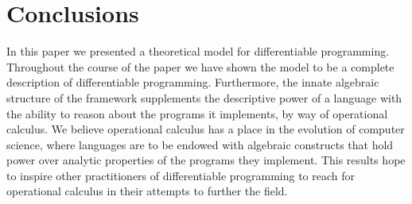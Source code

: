 \section{Conclusions}

In this paper we presented a theoretical model for differentiable programming.
Throughout the course of the paper we have shown the model to be a complete description of differentiable programming.
Furthermore, the innate algebraic structure of the framework supplements the descriptive power of a language with the ability to reason about the programs it implements, by way of operational calculus.
We believe operational calculus has a place in the evolution of computer science, where languages are to be endowed with algebraic constructs that hold power over analytic properties of the programs they implement.
This results hope to inspire other practitioners of differentiable programming to reach for operational calculus in their attempts to further the field. 
